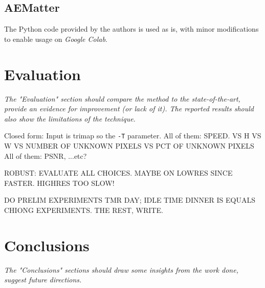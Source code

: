 \documentclass{article}
\begin{document}
\begin{multicols}{2}[]
\subsection{AEMatter}
The Python code provided by the authors is used as is, with minor modifications to enable usage on \emph{Google Colab}.

\section{Evaluation}\label{evaluation}
\emph{The "Evaluation" section should compare the method to the state-of-the-art, provide an evidence for improvement (or lack of it). The reported results should also show the limitations of the technique.}




Closed form: Input is trimap so the \verb|-T| parameter.
All of them: SPEED. VS H VS W VS NUMBER OF UNKNOWN PIXELS VS PCT OF UNKNOWN PIXELS
All of them: PSNR, ...etc?

ROBUST: EVALUATE ALL CHOICES. MAYBE ON LOWRES SINCE FASTER. HIGHRES TOO SLOW!

DO PRELIM EXPERIMENTS TMR DAY; IDLE TIME DINNER IS EQUALS CHIONG EXPERIMENTS. THE REST, WRITE.


\section{Conclusions}
\emph{The "Conclusions" sections should draw some insights from the work done, suggest future directions.}

\end{multicols}
\newpage



\vfill
\appendix
\end{document}
